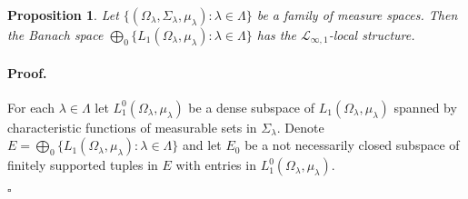 \documentclass[12pt]{article}
\newtheorem{proposition}[theorem]{Proposition}
\renewenvironment{proof}{\paragraph{Proof.}}{\hfill$\square$\medskip}
\begin{document}
\begin{proposition}\label{C0SumOfL1SpHaveDPP} Let
    $\{(\Omega_\lambda,\Sigma_\lambda,\mu_\lambda):\lambda\in\Lambda \}$ be a
    family of measure spaces. Then the Banach space
    $\bigoplus_0\{L_1(\Omega_\lambda,\mu_\lambda):\lambda\in\Lambda \}$ has the
    $\mathcal{L}_{\infty,1}$-local structure.
\end{proposition}
\begin{proof}
    For each $\lambda\in\Lambda$ let $L_1^0(\Omega_\lambda,\mu_\lambda)$ be a
    dense subspace of $L_1(\Omega_\lambda,\mu_\lambda)$ spanned by
    characteristic functions of measurable sets in $\Sigma_\lambda$.  Denote
    $E=\bigoplus_0\{L_1(\Omega_\lambda,\mu_\lambda):\lambda\in\Lambda \}$ and
    let $E_0$ be a not necessarily closed subspace of finitely supported tuples
    in $E$ with entries in $L_1^0(\Omega_\lambda,\mu_\lambda)$.


\end{proof}
\end{document}
